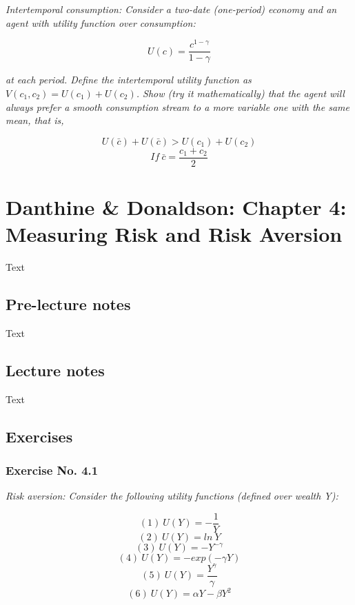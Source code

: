 \documentclass[]{book}
\theoremstyle{definition}
\theoremstyle{definition}
\theoremstyle{remark}
\begin{document}
\emph{Intertemporal consumption: Consider a two-date (one-period)
economy and an agent with utility function over consumption:}
\citep[p.5]{exercises_danthine}

\[U\left(c\right)=\frac{c^{1-\gamma}}{1-\gamma}\]

\emph{at each period. Define the intertemporal utility function as
\(V\left(c_1,c_2\right)=U\left(c_1\right)+U\left(c_2\right)\). Show (try
it mathematically) that the agent will always prefer a smooth
consumption stream to a more variable one with the same mean, that is,}
\citep[p.5]{exercises_danthine}

\[U\left(\bar{c}\right)+U\left(\bar{c}\right)>U\left(c_1\right)+U\left(c_2\right)\]
\[If \ \bar{c}=\frac{c_1+c_2}{2}\]

\chapter{Danthine \& Donaldson: Chapter 4: Measuring Risk and Risk
Aversion}\label{danthine-donaldson-chapter-4-measuring-risk-and-risk-aversion}

Text

\section{Pre-lecture notes}\label{pre-lecture-notes-2}

Text

\section{Lecture notes}\label{lecture-notes-2}

Text

\section{Exercises}\label{exercises-1}

\subsection{Exercise No. 4.1}\label{exercise-no.-4.1}

\emph{Risk aversion: Consider the following utility functions (defined
over wealth Y):} \citep[p.5]{exercises_danthine}

\[\left(1\right) \ U\left(Y\right)=-\frac{1}{Y}\]
\[\left(2\right) \ U\left(Y\right)=ln \ Y\]
\[\left(3\right) \ U\left(Y\right)=-Y^{-\gamma}\]
\[\left(4\right) \ U\left(Y\right)=-exp\left(-\gamma Y\right)\]
\[\left(5\right) \ U\left(Y\right)=\frac{Y^\gamma}{\gamma}\]
\[\left(6\right) \ U\left(Y\right)=\alpha Y-\beta Y^2\]
\end{document}
